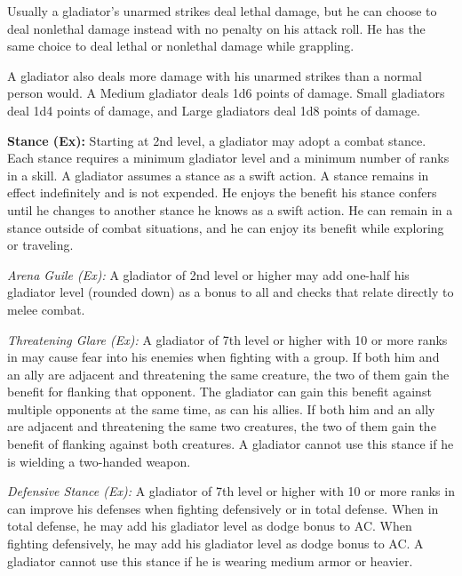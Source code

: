 Usually a gladiator's unarmed strikes deal lethal damage, but he can choose to deal nonlethal damage instead with no penalty on his attack roll. He has the same choice to deal lethal or nonlethal damage while grappling.

A gladiator also deals more damage with his unarmed strikes than a normal person would. A Medium gladiator deals 1d6 points of damage. Small gladiators deal 1d4 points of damage, and Large gladiators deal 1d8 points of damage.

\textbf{Stance (Ex):} Starting at 2nd level, a gladiator may adopt a combat stance. Each stance requires a minimum gladiator level and a minimum number of ranks in a skill. A gladiator assumes a stance as a swift action. A stance remains in effect indefinitely and is not expended. He enjoys the benefit his stance confers until he changes to another stance he knows as a swift action. He can remain in a stance outside of combat situations, and he can enjoy its benefit while exploring or traveling.

\textit{Arena Guile (Ex):} A gladiator of 2nd level or higher may add one-half his gladiator level (rounded down) as a bonus to all  and  checks that relate directly to melee combat.


\textit{Threatening Glare (Ex):} A gladiator of 7th level or higher with 10 or more ranks in  may cause fear into his enemies when fighting with a group. If both him and an ally are adjacent and threatening the same creature, the two of them gain the benefit for flanking that opponent. The gladiator can gain this benefit against multiple opponents at the same time, as can his allies. If both him and an ally are adjacent and threatening the same two creatures, the two of them gain the benefit of flanking against both creatures. A gladiator cannot use this stance if he is wielding a two-handed weapon.

\textit{Defensive Stance (Ex):} A gladiator of 7th level or higher with 10 or more ranks in  can improve his defenses when fighting defensively or in total defense. When in total defense, he may add \onehalf his gladiator level as dodge bonus to AC. When fighting defensively, he may add \onequarter his gladiator level as dodge bonus to AC. A gladiator cannot use this stance if he is wearing medium armor or heavier.

